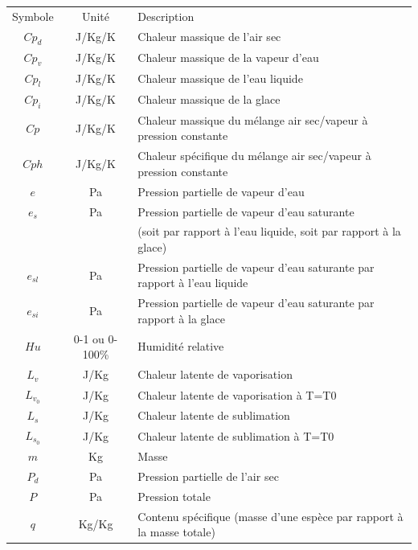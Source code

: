 \documentclass{article}
\begin{document}
\begin{table}[ht]
 \centering
 \begin{tabular}{|c|c|l|}
 \hline
 Symbole   & Unité               & Description \\
 $Cp_d$    & J/Kg/K              & Chaleur massique de l'air sec \\
 $Cp_v$    & J/Kg/K              & Chaleur massique de la vapeur d'eau \\
 $Cp_l$    & J/Kg/K              & Chaleur massique de l'eau liquide \\
 $Cp_i$    & J/Kg/K              & Chaleur massique de la glace \\
 $Cp$      & J/Kg/K              & Chaleur massique du mélange air sec/vapeur à pression constante \\
 $Cph$     & J/Kg/K              & Chaleur spécifique du mélange air sec/vapeur à pression constante \\
 $e$       & Pa                  & Pression partielle de vapeur d'eau \\
 $e_s$     & Pa                  & Pression partielle de vapeur d'eau saturante \\
           &                     & (soit par rapport à l'eau liquide, soit par rapport à la glace) \\
 $e_{sl}$  & Pa                  & Pression partielle de vapeur d'eau saturante par rapport à l'eau liquide \\
 $e_{si}$  & Pa                  & Pression partielle de vapeur d'eau saturante par rapport à la glace \\
 $Hu$      & 0-1 ou 0-100\%      & Humidité relative \\
 $L_v$     & J/Kg                & Chaleur latente de vaporisation \\
 $L_{v_0}$ & J/Kg                & Chaleur latente de vaporisation à T=T0 \\
 $L_s$     & J/Kg                & Chaleur latente de sublimation \\
 $L_{s_0}$ & J/Kg                & Chaleur latente de sublimation à T=T0 \\
 $m$       & Kg                  & Masse \\
 $P_d$     & Pa                  & Pression partielle de l'air sec \\
 $P$       & Pa                  & Pression totale \\
 $q$       & Kg/Kg               & Contenu spécifique (masse d'une espèce par rapport à la masse totale) \\

\end{tabular}
\end{table}
\end{document}
